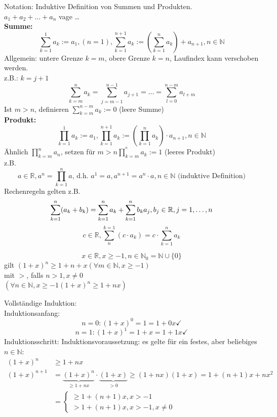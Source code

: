 \documentclass[../ana1.tex]{subfiles}
\begin{document}
Notation: Induktive Definition von Summen und Produkten.\\
$a_1+a_2+\ldots + a_n$ vage \dots\\
\textbf{Summe:} \[\sum_{k=1}^{1} a_k := a_1, (n = 1), \sum_{k=1}^{n+1} a_k := \left( \sum_{k=1}^{n} a_k\right) + a_{n+1}, n\in\mathbb{N}\]
Allgemein: untere Grenze $k=m$, obere Grenze $k=n$, Laufindex kann verschoben werden.\\
z.B.: $k= j+1$
\[\sum_{k=m}^{n}a_k = \sum_{j=m-1}^{n-1}a_{j+1} = \ldots = \sum_{l = 0}^{n-m}a_{l+m}\]
Ist $m>n$, definieren $\sum_{k=m}^{n-m}a_k := 0$ (leere Summe)\\
\textbf{Produkt:} $$\prod_{k=1}^{1}a_k := a_1, \prod_{k=1}^{n+1}a_k := \left( \prod_{k=1}^{n}a_k\right) \cdot a_{n+1}, n\in\mathbb{N}$$
Ähnlich $\prod_{k=m}^{n}a_n$, setzen für $m>n \prod_{k=m}^^n a_k := 1$ (leeres Produkt)\\
z.B. $$a\in\mathbb{R}, a^n = \prod_{k=1}^n a \text{, d.h. } a^1=a, a^{n+1} = a^n \cdot a, n\in\mathbb{N} \text{ (induktive Definition)}$$
Rechenregeln gelten z.B. $$\sum_{k=1}^{n} (a_k+b_k) = \sum_{k=1}^{n} a_k + \sum_{k=1}^{n} b_k\\
	a_j, b_j \in\mathbb{R}, j=1,\ldots, n$$
$$c \in\mathbb{R}, \sum_{n}^{k=1} (c\cdot a_k) = c\cdot \sum_{k=1}^{n} a_k$$
\begin{satz}
	$$x\in\mathbb{R}, x\geq -1, n\in\mathbb{N}_0 = \mathbb{N}\cup \{0\}$$
	gilt $(1+x)^n \geq 1+ n + x (\forall m\in\mathbb{N},x\geq -1)$\\mit \glqq $>$\grqq, falls $n>1, x\neq 0$\\
	$( \forall n\in\mathbb{N}, x \geq -1(1+x)^n \geq 1 + nx)$
\end{satz}
\begin{bew}
	Vollständige Induktion:\\
	Induktionsanfang:
	$$n=0: (1+x)^0=1=1+0x \checkmark$$
	$$n=1: (1+x)^1=1+x=1+1x \checkmark$$
	Induktionsschritt:
	Induktionsvoraussetzung: es gelte für ein festes, aber beliebiges $n\in\mathbb{N}$:
	\begin{equation*}
		\begin{aligned}
			(1+x)^n     & \geq 1+nx                                                                                              \\%
			(1+x)^{n+1} & = \underbrace{(1+x)^{n}}_{\geq 1+nx} \cdot \underbrace{(1+x)}_{> 0} \geq (1+nx)(1+x) = 1+(n+1)x + nx^2 \\
			            & =\begin{cases}
				\geq 1+(n+1)x, x>-1 \\
				> 1+(n+1)x, x>-1, x\neq 0
			\end{cases}
		\end{aligned}
	\end{equation*}
\end{bew}
\end{document}
